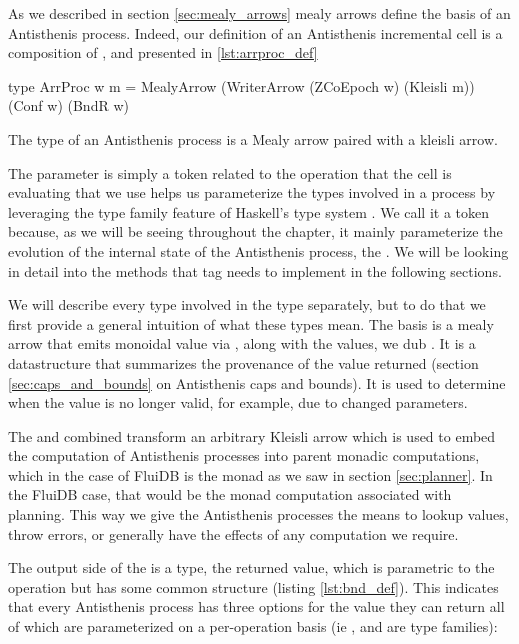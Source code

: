 As we described in section \ref{sec:mealy_arrows} mealy arrows define
the basis of an Antisthenis process. Indeed, our definition of an
Antisthenis incremental cell is a composition of ,
 and  presented in
\ref{lst:arrproc_def}

\begin{code}
\begin{haskellcode}
type ArrProc w m =
  MealyArrow (WriterArrow (ZCoEpoch w) (Kleisli m))
  (Conf w) (BndR w)
\end{haskellcode}
\caption{\label{lst:arrproc_def}The type of an Antisthenis process is a Mealy arrow paired
  with a kleisli arrow.}
\end{code}

The  parameter is simply a token related to the operation that
the cell is evaluating that we use helps us parameterize the types
involved in a process by leveraging the type family feature of
Haskell's type system \cite{AssociatedTypeSynonyms}. We call it a
 token because, as we will be seeing throughout the
chapter, it mainly parameterize the evolution of the internal state of
the Antisthenis process, the . We will be looking in
detail into the methods that  tag needs to
implement in the following sections.

We will describe every type involved in the  type
separately, but to do that we first provide a general intuition of
what these types mean. The basis is a mealy arrow that emits monoidal
value via , along with the values, we dub
.  It is a datastructure that summarizes the provenance
of the value returned (section \ref{sec:caps_and_bounds} on
Antisthenis caps and bounds). It is used to determine when the value
is no longer valid, for example, due to changed parameters.

The  and  combined transform an
arbitrary Kleisli arrow which is used to embed the computation of
Antisthenis processes into parent monadic computations, which in the
case of FluiDB is the  monad as we saw in section
\ref{sec:planner}. In the FluiDB case, that would be the monad
computation associated with planning. This way we give the
Antisthenis processes the means to lookup values, throw errors, or
generally have the effects of any computation we require.

The output side of the  is a  type, the
returned value, which is parametric to the operation but has some
common structure (listing \ref{lst:bnd_def}). This indicates that every
Antisthenis process has three options for the value they can return
all of which are parameterized on a per-operation basis (ie
,  and  are type families):

